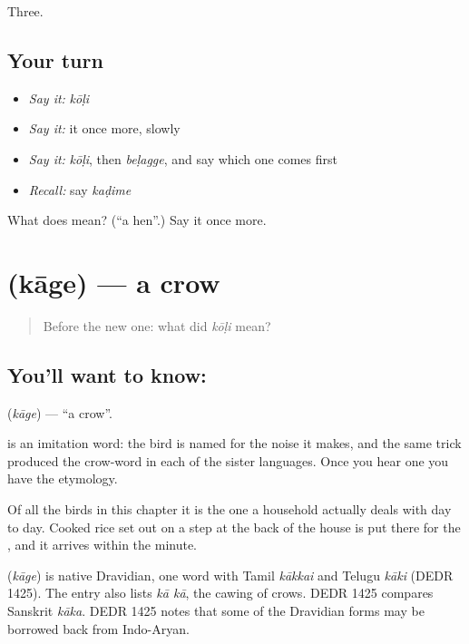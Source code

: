 \begin{grammarlens}[title={What you've built}]
Three.
\end{grammarlens}

\subsection*{Your turn}
\begin{itemize}
\raggedright
  \item \emph{Say it:} \emph{kōḷi}
  \item \emph{Say it:} it once more, slowly
  \item \emph{Say it:} \emph{kōḷi}, then \emph{beḷagge}, and say which one comes first
  \item \emph{Recall:} say \emph{kaḍime}
\end{itemize}

\begin{tcolorbox}[breakable,colback=teal!4,colframe=teal!35!black,title={Before you move on}]
What does  mean? (\textquotedblleft{}a hen\textquotedblright{}.) Say it once more.
\end{tcolorbox}
\section[\texorpdfstring{\kn{ಕಾಗೆ} (kāge)}{ಕಾಗೆ (kāge)}]{ (kāge) — a crow}

\label{lesson:KA-C60-crow}



\begin{quote}
Before the new one: what did \emph{kōḷi} mean?
\end{quote}

\subsection*{You'll want to know: }
\textbf{} (\emph{kāge}) — \textquotedblleft{}a crow\textquotedblright{}.

 is an imitation word: the bird is named for the noise it makes, and the same trick produced the crow-word in each of the sister languages. Once you hear one you have the etymology.

Of all the birds in this chapter it is the one a household actually deals with day to day. Cooked rice set out on a step at the back of the house is put there for the , and it arrives within the minute.

\begin{cousinweb}
\textbf{} (\emph{kāge}) is native Dravidian, one word with Tamil \emph{kākkai} and Telugu \emph{kāki} (DEDR 1425). The entry also lists \emph{kā kā}, the cawing of crows. DEDR 1425 compares Sanskrit \emph{kāka}. DEDR 1425 notes that some of the Dravidian forms may be borrowed back from Indo-Aryan.
\end{cousinweb}

